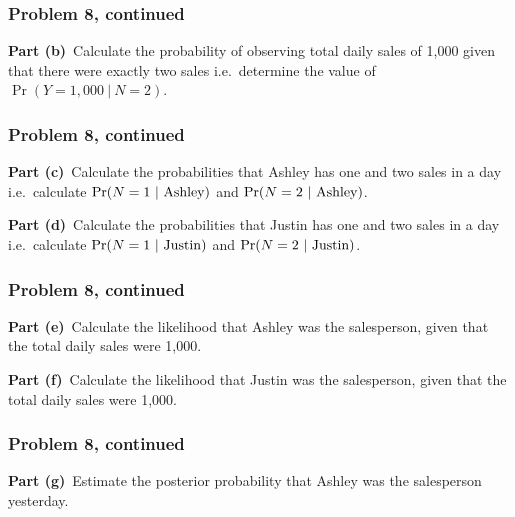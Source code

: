 \documentclass[12pt]{article}
\theoremstyle{definition}
\begin{document}
\newpage
\subsubsection*{Problem 8, continued}
\noindent
{\bf Part (b)}\ Calculate the probability of observing total daily sales of 1,000 given that there were exactly two sales i.e.\ determine the value of $\Pr(Y = 1,000\ |\ N = 2)$.

\newpage
\subsubsection*{Problem 8, continued}
\noindent
{\bf Part (c)}\ Calculate the probabilities that Ashley has one and two sales in a day i.e.\ calculate $\Pr(N = 1\ |\ \hbox{Ashley})$ and $\Pr(N = 2\ |\ \hbox{Ashley})$.



\vspace{3in}
\noindent
{\bf Part (d)}\ Calculate the probabilities that Justin has one and two sales in a day i.e.\ calculate $\Pr(N = 1\ |\ \hbox{Justin})$ and $\Pr(N = 2\ |\ \hbox{Justin})$.




\newpage
\subsubsection*{Problem 8, continued}
\noindent
{\bf Part (e)}\ Calculate the likelihood that Ashley was the salesperson, given that the total daily sales were 1,000.




\vspace{3in}
\noindent
{\bf Part (f)}\ Calculate the likelihood that Justin was the salesperson, given that the total daily sales were 1,000.



\newpage
\subsubsection*{Problem 8, continued}
\noindent
{\bf Part (g)}\ Estimate the posterior probability that Ashley was the salesperson yesterday.
\end{document}
